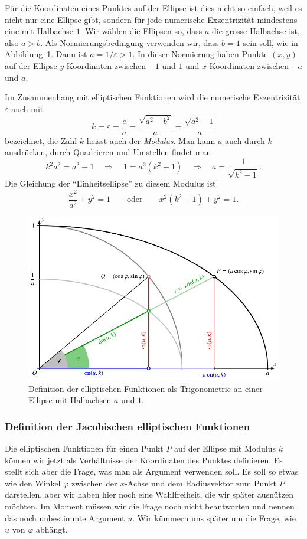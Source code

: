 Für die Koordinaten eines Punktes auf der Ellipse ist dies nicht so einfach,
weil es nicht nur eine Ellipse gibt, sondern für jede numerische Exzentrizität
mindestens eine mit Halbachse $1$.
Wir wählen die Ellipsen so, dass $a$ die grosse Halbachse ist, also $a>b$.
Als Normierungsbedingung verwenden wir, dass $b=1$ sein soll, wie in
Abbildung~\ref{buch:elliptisch:fig:jacobidef}.
Dann ist $a=1/\varepsilon>1$.
In dieser Normierung haben Punkte $(x,y)$ auf der Ellipse $y$-Koordinaten
zwischen $-1$ und $1$ und $x$-Koordinaten zwischen $-a$ und $a$.

Im Zusammenhang mit elliptischen Funktionen wird die numerische Exzentrizität
$\varepsilon$ auch mit
\[
k
=
\varepsilon
=
\frac{e}{a}
=
\frac{\sqrt{a^2-b^2}}{a}
=
\frac{\sqrt{a^2-1}}{a}
\]
bezeichnet,
die Zahl $k$ heisst auch der {\em Modulus}.
Man kann $a$ auch durch $k$ ausdrücken, durch Quadrieren und Umstellen
findet man
\[
k^2a^2 = a^2-1
\quad\Rightarrow\quad
1=a^2(k^2-1)
\quad\Rightarrow\quad
a=\frac{1}{\sqrt{k^2-1}}.
\]
Die Gleichung der ``Einheitsellipse'' zu diesem Modulus ist
\[
\frac{x^2}{a^2}+y^2=1
\qquad\text{oder}\qquad
x^2(k^2-1) + y^2 = 1.
\]

%
%
\begin{figure}
\centering
\includegraphics{chapters/110-elliptisch/images/jacobidef.pdf}
\caption{Definition der elliptischen Funktionen als Trigonometrie
an einer Ellipse mit Halbachsen $a$ und $1$.
\label{buch:elliptisch:fig:jacobidef}}
\end{figure}
\subsubsection{Definition der Jacobischen elliptischen Funktionen}
Die elliptischen Funktionen für einen Punkt $P$ auf der Ellipse mit Modulus $k$
können wir jetzt als Verhältnisse der Koordinaten des Punktes definieren.
Es stellt sich aber die Frage, was man als Argument verwenden soll.
Es soll so etwas wie den Winkel $\varphi$ zwischen der $x$-Achse und dem
Radiusvektor zum Punkt $P$
darstellen, aber wir haben hier noch eine Wahlfreiheit, die wir später
ausnützen möchten.
Im Moment müssen wir die Frage noch nicht beantworten und nennen das
noch unbestimmte Argument $u$.
Wir kümmern uns später um die Frage, wie $u$ von $\varphi$ abhängt.

